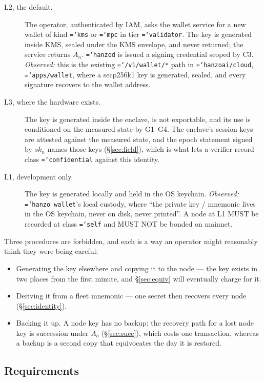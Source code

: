 \documentclass[11pt,a4paper]{article}
\newcommand{\code}[1]{\texttt{\hyphenchar\font=`\-\relax #1}}
\begin{document}
\begin{description}
\item[L2, the default.] The operator, authenticated by IAM, asks the wallet
  service for a new wallet of kind \code{kms} or \code{mpc} in tier
  \code{validator}. The key is generated inside KMS, sealed under the KMS envelope,
  and never returned; the service returns $A_n$. \code{hanzod} is issued a signing
  credential scoped by C3. \emph{Observed:} this is the existing
  \code{/v1/wallet/*} path in \code{hanzoai/cloud}, \code{apps/wallet}, where a
  secp256k1 key is generated, sealed, and every signature recovers to the wallet
  address.

\item[L3, where the hardware exists.] The key is generated inside the enclave, is
  not exportable, and its use is conditioned on the measured state by G1--G4. The
  enclave's session keys are attested against the measured state, and the epoch
  statement signed by $sk_n$ names those keys (\S\ref{sec:field}), which is what
  lets a verifier record class \code{confidential} against this identity.

\item[L1, development only.] The key is generated locally and held in the OS
  keychain. \emph{Observed:} \code{hanzo wallet}'s local custody, where ``the
  private key / mnemonic lives in the OS keychain, never on disk, never printed''.
  A node at L1 MUST be recorded at class \code{self} and MUST NOT be bonded on
  mainnet.
\end{description}

Three procedures are forbidden, and each is a way an operator might reasonably
think they were being careful:

\begin{itemize}
\item Generating the key elsewhere and copying it to the node --- the key exists in
  two places from the first minute, and \S\ref{sec:equiv} will eventually charge
  for it.
\item Deriving it from a fleet mnemonic --- one secret then recovers every node
  (\S\ref{sec:identity}).
\item Backing it up. A node key has no backup: the recovery path for a lost node
  key is succession under $A_o$ (\S\ref{sec:succ}), which costs one transaction,
  whereas a backup is a second copy that equivocates the day it is restored.
\end{itemize}

\subsection{Requirements}
\end{document}
